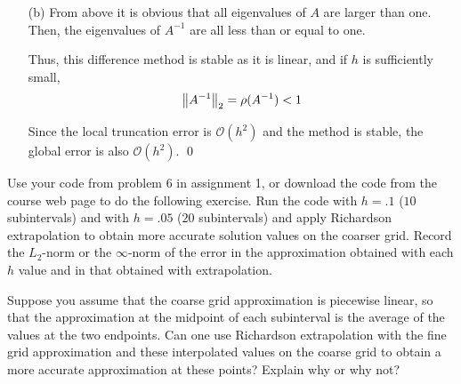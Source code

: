 \documentclass[10pt]{article}
\begin{document}
\begin{solution}[Solution]
\begin{enumerate}
    \item[(b)] 
        From above it is obvious that all eigenvalues of \( A \) are larger than one. Then, the eigenvalues of \( A^{-1} \) are all less than or equal to one. 

        Thus, this difference method is stable as it is linear, and if \( h \) is sufficiently small, 
        \begin{align*}
            \left\lVert A^{-1}\right\rVert_2 = \rho(A^{-1}) < 1
        \end{align*}

        Since the local truncation error is \( \mathcal{O}(h^2) \) and the method is stable, the global error is also \( \mathcal{O}(h^2) \). \qed


\end{enumerate}

\end{solution}

\begin{problem}
Use your code from problem 6 in assignment 1, or download the code from the
course web page to do the following exercise.  Run the code with \(h = .1\)
($10$ subintervals) and with \(h=.05\) ($20$ subintervals) and apply
Richardson extrapolation to obtain more accurate solution values on the
coarser grid.  Record the \(L_2\)-norm or the \(\infty\)-norm of the error
in the approximation obtained with each \(h\) value and in that obtained
with extrapolation.

Suppose you assume that the coarse grid approximation is piecewise
linear, so that the approximation at the midpoint of each subinterval
is the average of the values at the two endpoints.  Can one use Richardson
extrapolation with the fine grid approximation and these interpolated
values on the coarse grid to obtain a more accurate approximation at
these points?  Explain why or why not?
\end{problem}
\end{document}
